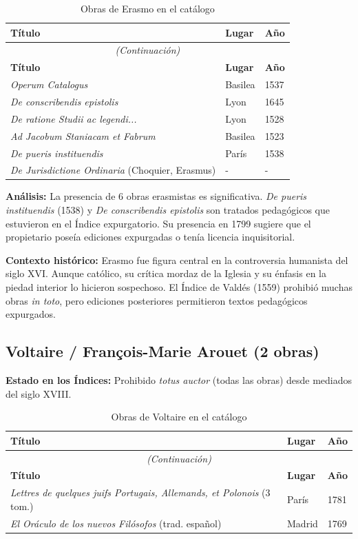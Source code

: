 \documentclass[12pt,a4paper]{article}
\begin{document}
\begin{longtable}{p{8cm}p{2.5cm}p{2cm}}
\caption{Obras de Erasmo en el catálogo} \\
\toprule
\textbf{Título} & \textbf{Lugar} & \textbf{Año} \\
\midrule
\endfirsthead
\multicolumn{3}{c}{\textit{(Continuación)}} \\
\toprule
\textbf{Título} & \textbf{Lugar} & \textbf{Año} \\
\midrule
\endhead
\bottomrule
\endfoot

\textit{Operum Catalogus} & Basilea & 1537 \\
\textit{De conscribendis epistolis} & Lyon & 1645 \\
\textit{De ratione Studii ac legendi...} & Lyon & 1528 \\
\textit{Ad Jacobum Staniacam et Fabrum} & Basilea & 1523 \\
\textit{De pueris instituendis} & París & 1538 \\
\textit{De Jurisdictione Ordinaria} (Choquier, Erasmus) & - & - \\

\end{longtable}

\textbf{Análisis:} La presencia de 6 obras erasmistas es significativa. \textit{De pueris instituendis} (1538) y \textit{De conscribendis epistolis} son tratados pedagógicos que estuvieron en el Índice expurgatorio. Su presencia en 1799 sugiere que el propietario poseía ediciones expurgadas o tenía licencia inquisitorial.

\textbf{Contexto histórico:} Erasmo fue figura central en la controversia humanista del siglo XVI. Aunque católico, su crítica mordaz de la Iglesia y su énfasis en la piedad interior lo hicieron sospechoso. El Índice de Valdés (1559) prohibió muchas obras \textit{in toto}, pero ediciones posteriores permitieron textos pedagógicos expurgados.

\subsection{Voltaire / François-Marie Arouet (2 obras)}

\textbf{Estado en los Índices:} Prohibido \textit{totus auctor} (todas las obras) desde mediados del siglo XVIII.

\begin{longtable}{p{8cm}p{2.5cm}p{2cm}}
\caption{Obras de Voltaire en el catálogo} \\
\toprule
\textbf{Título} & \textbf{Lugar} & \textbf{Año} \\
\midrule
\endfirsthead
\multicolumn{3}{c}{\textit{(Continuación)}} \\
\toprule
\textbf{Título} & \textbf{Lugar} & \textbf{Año} \\
\midrule
\endhead
\bottomrule
\endfoot

\textit{Lettres de quelques juifs Portugais, Allemands, et Polonois} (3 tom.) & París & 1781 \\
\textit{El Oráculo de los nuevos Filósofos} (trad. español) & Madrid & 1769 \\

\end{longtable}
\end{document}
